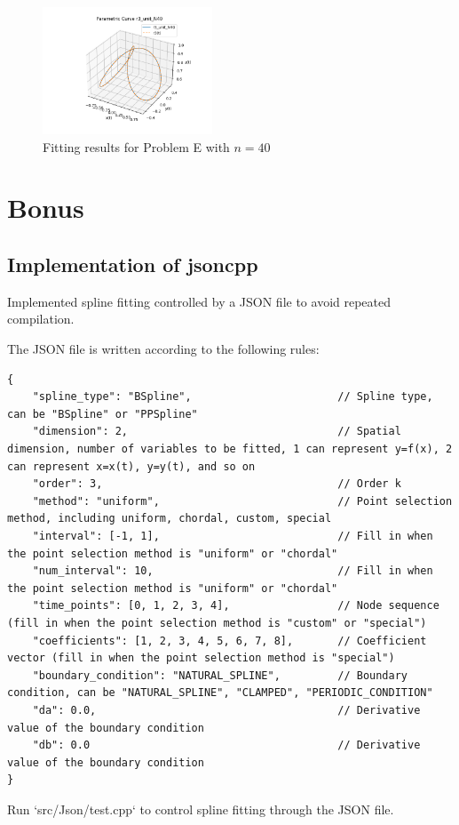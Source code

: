\documentclass[a4paper]{article}
\begin{document}
\begin{figure}[H]
    \includegraphics[width=0.45\textwidth]{./figure/problemE/r3_unit_N40.png}
    \caption{Fitting results for Problem E with \( n = 40 \)}
\end{figure}

\section{Bonus}

\subsection{Implementation of jsoncpp}

Implemented spline fitting controlled by a JSON file to avoid repeated compilation.

The JSON file is written according to the following rules:
\begin{lstlisting}[]
{
    "spline_type": "BSpline",                       // Spline type, can be "BSpline" or "PPSpline"
    "dimension": 2,                                 // Spatial dimension, number of variables to be fitted, 1 can represent y=f(x), 2 can represent x=x(t), y=y(t), and so on
    "order": 3,                                     // Order k
    "method": "uniform",                            // Point selection method, including uniform, chordal, custom, special
    "interval": [-1, 1],                            // Fill in when the point selection method is "uniform" or "chordal"
    "num_interval": 10,                             // Fill in when the point selection method is "uniform" or "chordal"
    "time_points": [0, 1, 2, 3, 4],                 // Node sequence (fill in when the point selection method is "custom" or "special")
    "coefficients": [1, 2, 3, 4, 5, 6, 7, 8],       // Coefficient vector (fill in when the point selection method is "special")
    "boundary_condition": "NATURAL_SPLINE",         // Boundary condition, can be "NATURAL_SPLINE", "CLAMPED", "PERIODIC_CONDITION"
    "da": 0.0,                                      // Derivative value of the boundary condition
    "db": 0.0                                       // Derivative value of the boundary condition
}
\end{lstlisting}
Run `src/Json/test.cpp` to control spline fitting through the JSON file.
\end{document}
